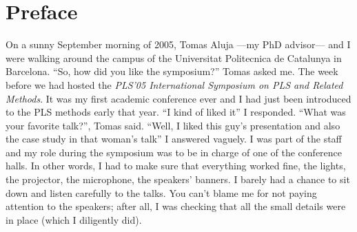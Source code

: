 \documentclass[12pt]{book}\usepackage{graphicx, color}
\begin{document}
\newpage
\renewcommand{\cftchapdotsep}{\cftdotsep}
\tableofcontents




\pagestyle{fancy}
   

\pagestyle{fancy}
\fancyhf{}
\lhead[]{\thepage}
\rhead[\thepage]{}
\rfoot{\scriptsize{\textsf{\textcolor{gray}{PLS Path Modeling with R}}}}







\chapter*{Preface}
On a sunny September morning of 2005, Tomas Aluja ---my PhD advisor--- and I were walking around the campus of the Universitat Politecnica de Catalunya in Barcelona. ``So, how did you like the symposium?'' Tomas asked me. The week before we had hosted the \textit{PLS'05 International Symposium on PLS and Related Methods}. It was my first academic conference ever and I had just been introduced to the PLS methods early that year. ``I kind of liked it'' I responded. ``What was your favorite talk?'', Tomas said. ``Well, I liked this guy's presentation and also the case study in that woman's talk'' I answered vaguely. I was part of the staff and my role during the symposium was to be in charge of one of the conference halls. In other words, I had to make sure that everything worked fine, the lights, the projector, the microphone, the speakers' banners. I barely had a chance to sit down and listen carefully to the talks. You can't blame me for not paying attention to the speakers; after all, I was checking that all the small details were in place (which I diligently did).
\end{document}
